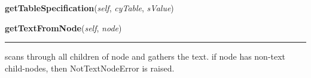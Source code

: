     \vspace{0.5ex}

\hspace{.8\funcindent}\begin{boxedminipage}{\funcwidth}

    \raggedright \textbf{getTableSpecification}(\textit{self}, \textit{cyTable}, \textit{sValue})

\setlength{\parskip}{2ex}
\setlength{\parskip}{1ex}
    \end{boxedminipage}

    \label{cuon:Reports:MyXML:MyXML:getTextFromNode}

    \vspace{0.5ex}

\hspace{.8\funcindent}\begin{boxedminipage}{\funcwidth}

    \raggedright \textbf{getTextFromNode}(\textit{self}, \textit{node})

    \vspace{-1.5ex}

    \rule{\textwidth}{0.5\fboxrule}
\setlength{\parskip}{2ex}
    scans through all children of node and gathers the text. if node has 
    non-text child-nodes, then NotTextNodeError is raised.

\setlength{\parskip}{1ex}
    \end{boxedminipage}

    \label{cuon:Reports:MyXML:MyXML:nodeToDic}

    \vspace{0.5ex}


